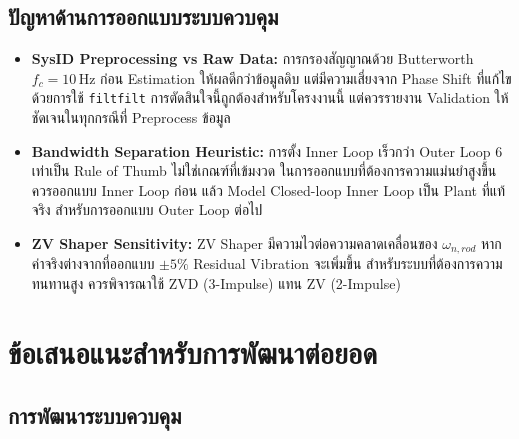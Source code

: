 \subsection{ปัญหาด้านการออกแบบระบบควบคุม}
\label{subsec:ctrl_lessons}

\begin{itemize}
  \item \textbf{SysID Preprocessing vs Raw Data:}
        การกรองสัญญาณด้วย Butterworth $f_c = 10$\,Hz ก่อน Estimation
        ให้ผลดีกว่าข้อมูลดิบ แต่มีความเสี่ยงจาก Phase Shift
        ที่แก้ไขด้วยการใช้ \texttt{filtfilt}
        การตัดสินใจนี้ถูกต้องสำหรับโครงงานนี้
        แต่ควรรายงาน Validation ให้ชัดเจนในทุกกรณีที่ Preprocess ข้อมูล

  \item \textbf{Bandwidth Separation Heuristic:}
        การตั้ง Inner Loop เร็วกว่า Outer Loop 6 เท่าเป็น Rule of Thumb
        ไม่ใช่เกณฑ์ที่เข้มงวด
        ในการออกแบบที่ต้องการความแม่นยำสูงขึ้น ควรออกแบบ Inner Loop ก่อน
        แล้ว Model Closed-loop Inner Loop เป็น Plant ที่แท้จริง
        สำหรับการออกแบบ Outer Loop ต่อไป

  \item \textbf{ZV Shaper Sensitivity:}
        ZV Shaper มีความไวต่อความคลาดเคลื่อนของ $\omega_{n,rod}$
        หากค่าจริงต่างจากที่ออกแบบ $\pm 5\%$
        Residual Vibration จะเพิ่มขึ้น
        สำหรับระบบที่ต้องการความทนทานสูง
        ควรพิจารณาใช้ ZVD (3-Impulse) แทน ZV (2-Impulse)
\end{itemize}

\section{ข้อเสนอแนะสำหรับการพัฒนาต่อยอด}
\label{sec:future_work}

\subsection{การพัฒนาระบบควบคุม}
\label{subsec:future_control}

